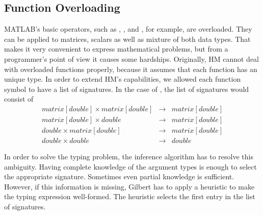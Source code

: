 
\subsection{Function Overloading}

MATLAB's basic operators, such as \code{+}, \code{-}, \code{/} and \code{*}, for example, are overloaded.
They can be applied to matrices, scalars as well as mixture of both data types.
That makes it very convenient to express mathematical problems, but from a programmer's point of view it causes some hardships.
Originally, HM cannot deal with overloaded functions properly, because it assumes that each function has an unique type.
In order to extend HM's capabilities, we allowed each function symbol to have a list of signatures.
In the case of \code{+}, the list of signatures would consist of 
\begin{eqnarray*}
matrix[double] \times matrix[double] &\rightarrow& matrix[double]\\
matrix[double] \times double &\rightarrow& matrix[double]\\
double \times matrix[double] &\rightarrow& matrix[double]\\
double \times double &\rightarrow& double
\end{eqnarray*}

In order to solve the typing problem, the inference algorithm has to resolve this ambiguity.
Having complete knowledge of the argument types is enough to select the appropriate signature.
Sometimes even partial knowledge is sufficient.
However, if this information is missing, Gilbert has to apply a heuristic to make the typing expression well-formed.
The heuristic selects the first entry in the list of signatures.

